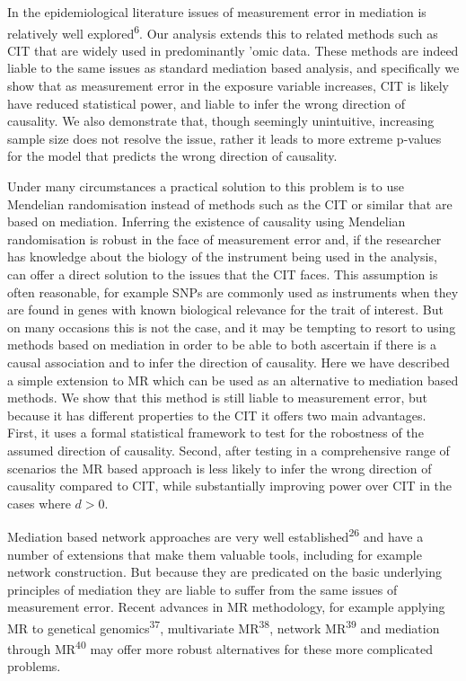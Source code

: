 \documentclass[]{article}
\begin{document}
In the epidemiological literature issues of measurement error in
mediation is relatively well explored\textsuperscript{6}. Our analysis
extends this to related methods such as CIT that are widely used in
predominantly 'omic data. These methods are indeed liable to the same
issues as standard mediation based analysis, and specifically we show
that as measurement error in the exposure variable increases, CIT is
likely have reduced statistical power, and liable to infer the wrong
direction of causality. We also demonstrate that, though seemingly
unintuitive, increasing sample size does not resolve the issue, rather
it leads to more extreme p-values for the model that predicts the wrong
direction of causality.

Under many circumstances a practical solution to this problem is to use
Mendelian randomisation instead of methods such as the CIT or similar
that are based on mediation. Inferring the existence of causality using
Mendelian randomisation is robust in the face of measurement error and,
if the researcher has knowledge about the biology of the instrument
being used in the analysis, can offer a direct solution to the issues
that the CIT faces. This assumption is often reasonable, for example
SNPs are commonly used as instruments when they are found in genes with
known biological relevance for the trait of interest. But on many
occasions this is not the case, and it may be tempting to resort to
using methods based on mediation in order to be able to both ascertain
if there is a causal association and to infer the direction of
causality. Here we have described a simple extension to MR which can be
used as an alternative to mediation based methods. We show that this
method is still liable to measurement error, but because it has
different properties to the CIT it offers two main advantages. First, it
uses a formal statistical framework to test for the robostness of the
assumed direction of causality. Second, after testing in a comprehensive
range of scenarios the MR based approach is less likely to infer the
wrong direction of causality compared to CIT, while substantially
improving power over CIT in the cases where \(d > 0\).

Mediation based network approaches are very well
established\textsuperscript{26} and have a number of extensions that
make them valuable tools, including for example network construction.
But because they are predicated on the basic underlying principles of
mediation they are liable to suffer from the same issues of measurement
error. Recent advances in MR methodology, for example applying MR to
genetical genomics\textsuperscript{37}, multivariate
MR\textsuperscript{38}, network MR\textsuperscript{39} and mediation
through MR\textsuperscript{40} may offer more robust alternatives for
these more complicated problems.
\end{document}
